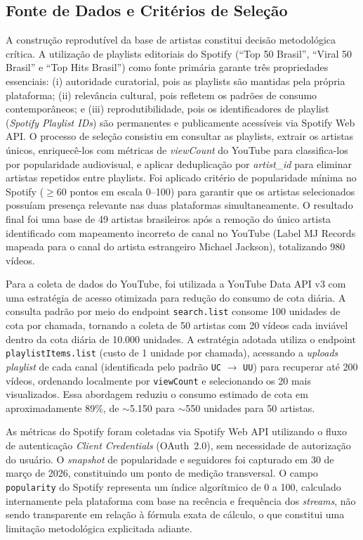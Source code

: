 \documentclass[12pt, a4paper]{article}
\begin{document}
\subsection{Fonte de Dados e Critérios de Seleção}

A construção reprodutível da base de artistas constitui decisão metodológica crítica. A utilização de playlists editoriais do Spotify (``Top 50 Brasil'', ``Viral 50 Brasil'' e ``Top Hits Brasil'') como fonte primária garante três propriedades essenciais: (i) autoridade curatorial, pois as playlists são mantidas pela própria plataforma; (ii) relevância cultural, pois refletem os padrões de consumo contemporâneos; e (iii) reprodutibilidade, pois os identificadores de playlist (\textit{Spotify Playlist IDs}) são permanentes e publicamente acessíveis via Spotify Web API. O processo de seleção consistiu em consultar as playlists, extrair os artistas únicos, enriquecê-los com métricas de \textit{viewCount} do YouTube para classifica-los por popularidade audiovisual, e aplicar deduplicação por \textit{artist\_id} para eliminar artistas repetidos entre playlists. Foi aplicado critério de popularidade mínima no Spotify ($\geq 60$ pontos em escala 0--100) para garantir que os artistas selecionados possuíam presença relevante nas duas plataformas simultaneamente. O resultado final foi uma base de 49 artistas brasileiros após a remoção do único artista identificado com mapeamento incorreto de canal no YouTube (Label MJ Records mapeada para o canal do artista estrangeiro Michael Jackson), totalizando 980 vídeos.

Para a coleta de dados do YouTube, foi utilizada a YouTube Data API v3 com uma estratégia de acesso otimizada para redução do consumo de cota diária. A consulta padrão por meio do endpoint \texttt{search.list} consome 100 unidades de cota por chamada, tornando a coleta de 50 artistas com 20 vídeos cada inviável dentro da cota diária de 10.000 unidades. A estratégia adotada utiliza o endpoint \texttt{playlistItems.list} (custo de 1 unidade por chamada), acessando a \textit{uploads playlist} de cada canal (identificada pelo padrão \texttt{UC} $\to$ \texttt{UU}) para recuperar até 200 vídeos, ordenando localmente por \texttt{viewCount} e selecionando os 20 mais visualizados. Essa abordagem reduziu o consumo estimado de cota em aproximadamente 89\%, de $\sim$5.150 para $\sim$550 unidades para 50 artistas.

As métricas do Spotify foram coletadas via Spotify Web API utilizando o fluxo de autenticação \textit{Client Credentials} (OAuth~2.0), sem necessidade de autorização do usuário. O \textit{snapshot} de popularidade e seguidores foi capturado em 30 de março de 2026, constituindo um ponto de medição transversal. O campo \texttt{popularity} do Spotify representa um índice algorítmico de 0 a 100, calculado internamente pela plataforma com base na recência e frequência dos \textit{streams}, não sendo transparente em relação à fórmula exata de cálculo, o que constitui uma limitação metodológica explicitada adiante.
\end{document}
